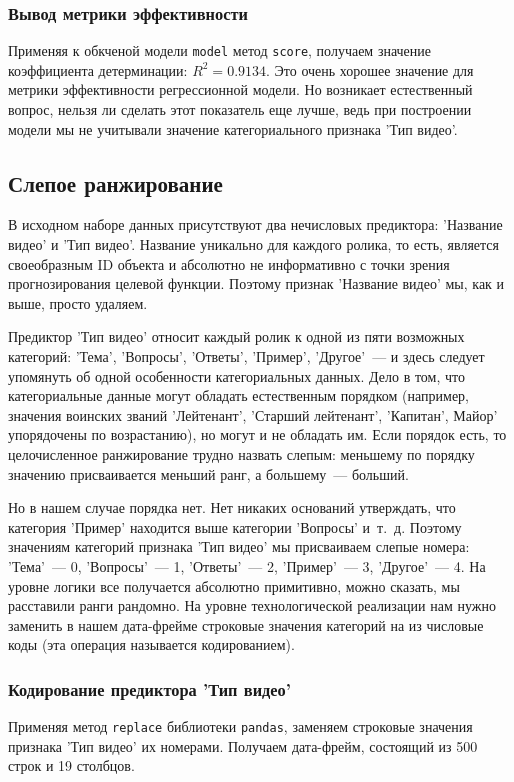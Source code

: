 \documentclass[a4paper,12pt]{article}
\begin{document}
\subsubsection{Вывод метрики эффективности} Применяя к обкченой модели  \texttt{model} метод \texttt{score}, получаем значение коэффициента детерминации: $R^2 = 0.9134$. Это очень хорошее значение для метрики эффективности регрессионной модели. Но возникает естественный вопрос, нельзя ли сделать этот показатель еще лучше, ведь при построении модели мы не учитывали значение категориального признака 'Тип видео'.

\subsection{Слепое ранжирование}
В исходном наборе данных присутствуют два нечисловых предиктора: 'Название видео' и 'Тип видео'. Название уникально для каждого ролика, то есть, является своеобразным ID объекта и абсолютно не информативно с точки зрения прогнозирования целевой функции. Поэтому признак 'Название видео' мы, как и выше, просто удаляем. 

Предиктор 'Тип видео' относит каждый ролик к одной из пяти возможных категорий: 'Тема', 'Вопросы', 'Ответы', 'Пример', 'Другое'~--- и здесь следует упомянуть об одной особенности категориальных данных. Дело в том, что категориальные данные могут обладать естественным порядком (например, значения воинских званий 'Лейтенант', 'Старший лейтенант', 'Капитан', Майор' упорядочены по возрастанию), но могут и не обладать им. Если порядок есть, то целочисленное ранжирование трудно назвать слепым: меньшему по порядку значению присваивается меньший ранг, а большему~--- больший. 

Но в нашем случае порядка нет. Нет никаких оснований утверждать, что категория 'Пример' находится выше категории 'Вопросы' и т. д. Поэтому значениям категорий признака 'Тип видео' мы присваиваем слепые номера: 'Тема'~--- 0, 'Вопросы'~--- 1, 'Ответы'~--- 2, 'Пример'~--- 3, 'Другое'~--- 4. На уровне логики все получается абсолютно примитивно, можно сказать, мы расставили ранги рандомно. На уровне технологической реализации нам нужно заменить в нашем дата-фрейме строковые значения категорий на из числовые коды (эта операция называется кодированием). 
\subsubsection{Кодирование предиктора 'Тип видео'} Применяя метод \texttt{replace} библиотеки \texttt{pandas}, заменяем строковые значения признака 'Тип видео' их номерами. Получаем дата-фрейм, состоящий из 500 строк и 19 столбцов.
\end{document}
